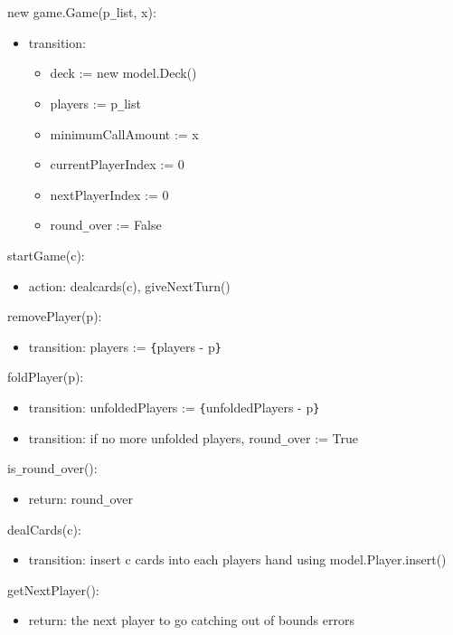 \documentclass[12pt, titlepage]{article}
\begin{document}
\noindent new game.Game(p\verb|_|list, x):
\begin{itemize}
\item transition:
    \begin{itemize}
        \item deck := new model.Deck()
        \item players := p\verb|_|list
        \item minimumCallAmount := x
        \item currentPlayerIndex := 0
        \item nextPlayerIndex := 0
        \item round\verb|_|over := False
    \end{itemize}
\end{itemize}

\noindent startGame(c):
\begin{itemize}
\item action: dealcards(c), giveNextTurn()
\end{itemize}

\noindent removePlayer(p):
\begin{itemize}
\item transition: players := \verb|{|players - p\verb|}|\\
\end{itemize}

\noindent foldPlayer(p):
\begin{itemize}
\item transition: unfoldedPlayers := \verb|{|unfoldedPlayers - p\verb|}|\\
\item transition: if no more unfolded players, round\verb|_|over := True
\end{itemize}

\noindent is\verb|_|round\verb|_|over():
\begin{itemize}
    \item return: round\verb|_|over
\end{itemize}

\noindent dealCards(c):
\begin{itemize}
    \item transition: insert c cards into each players hand using model.Player.insert()
\end{itemize}

\noindent getNextPlayer():
\begin{itemize}
    \item return: the next player to go
    \exception catching out of bounds errors
\end{itemize}
\end{document}
